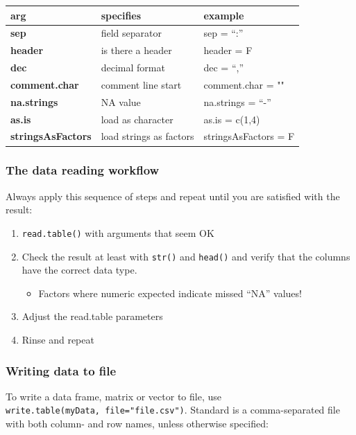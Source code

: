 \documentclass[]{book}
\providecommand{\tightlist}{%
  \setlength{\itemsep}{0pt}\setlength{\parskip}{0pt}}
\begin{document}
\begin{longtable}[]{@{}lll@{}}
\toprule
arg & specifies & example\tabularnewline
\midrule
\endhead
\textbf{sep} & field separator & sep = ``:''\tabularnewline
\textbf{header} & is there a header & header = F\tabularnewline
\textbf{dec} & decimal format & dec = ``,''\tabularnewline
\textbf{comment.char} & comment line start & comment.char = ""\tabularnewline
\textbf{na.strings} & NA value & na.strings = ``-''\tabularnewline
\textbf{as.is} & load as character & as.is = c(1,4)\tabularnewline
\textbf{stringsAsFactors} & load strings as factors & stringsAsFactors = F\tabularnewline
\bottomrule
\end{longtable}

\hypertarget{the-data-reading-workflow}{%
\subsubsection*{The data reading workflow}\label{the-data-reading-workflow}}

Always apply this sequence of steps and repeat until you are satisfied with the result:

\begin{enumerate}
\def\labelenumi{\arabic{enumi}.}
\tightlist
\item
  \texttt{read.table()} with arguments that seem OK
\item
  Check the result at least with \texttt{str()} and \texttt{head()} and verify that the columns have the correct data type.

  \begin{itemize}
  \tightlist
  \item
    Factors where numeric expected indicate missed ``NA'' values!
  \end{itemize}
\item
  Adjust the read.table parameters
\item
  Rinse and repeat
\end{enumerate}

\hypertarget{writing-data-to-file}{%
\subsubsection*{Writing data to file}\label{writing-data-to-file}}

To write a data frame, matrix or vector to file, use \texttt{write.table(myData,\ file="file.csv")}. Standard is a comma-separated file with both column- and row names, unless otherwise specified:
\end{document}
